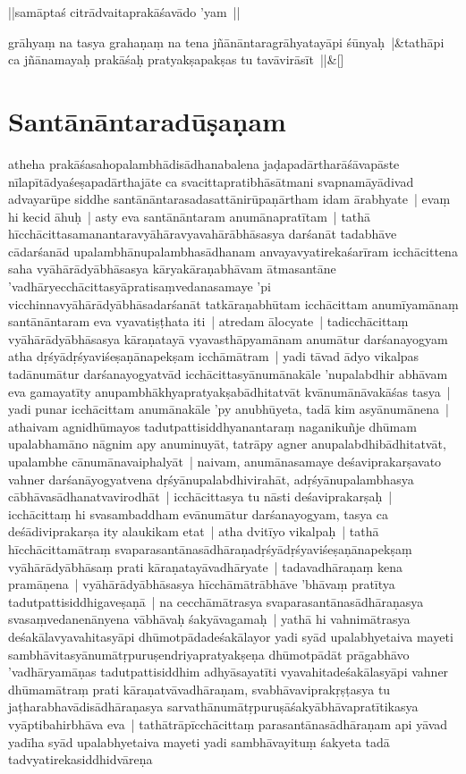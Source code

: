 \documentclass[article,12pt,a4paper]{memoir}
\begin{document}
	  \pstart ||samāptaś citrādvaitaprakāśavādo 'yam ||
	\pend
      
	    
	    \stanza[\smallbreak]
	grāhyaṃ na tasya grahaṇaṃ na tena jñānāntaragrāhyatayāpi śūnyaḥ |&tathāpi ca jñānamayaḥ prakāśaḥ pratyakṣapakṣas tu tavāvirāsīt ||\&[\smallbreak]


	
	  
	
\chapter[{Santānāntaradūṣaṇam}]{Santānāntaradūṣaṇam}\label{Santānāntaradūṣaṇam}

	  \pstart atheha prakāśasahopalambhādisādhanabalena jaḍapadārtharāśāvapāste nīlapītādyaśeṣapadārthajāte ca svacittapratibhāsātmani svapnamāyādivad advayarūpe siddhe santānāntarasadasattānirūpaṇārtham idam ārabhyate | \label{thakur75-145.6} evaṃ hi kecid āhuḥ | asty eva santānāntaram anumānapratītam | tathā hīcchācittasamanantaravyāhāravyavahārābhāsasya darśanāt tadabhāve cādarśanād upalambhānupalambhasādhanam anvayavyatirekaśarīram icchācittena saha vyāhārādyābhāsasya kāryakāraṇabhāvam ātmasantāne 'vadhāryecchācittasyāpratisaṃvedanasamaye 'pi vicchinnavyāhārādyābhāsadarśanāt tatkāraṇabhūtam icchācittam anumīyamānaṃ santānāntaram eva vyavatiṣṭhata iti | \label{thakur75-145.12} atredam ālocyate | tadicchācittaṃ vyāhārādyābhāsasya kāraṇatayā vyavasthāpyamānam anumātur darśanayogyam atha dṛśyādṛśyaviśeṣaṇānapekṣam icchāmātram | yadi tāvad ādyo vikalpas tadānumātur darśanayogyatvād icchācittasyānumānakāle 'nupalabdhir abhāvam eva gamayatīty anupambhākhyapratyakṣabādhitatvāt kvānumānāvakāśas tasya | yadi punar icchācittam anumānakāle 'py anubhūyeta, tadā kim asyānumānena | athaivam agnidhūmayos tadutpattisiddhyanantaraṃ naganikuñje dhūmam upalabhamāno nāgnim apy anuminuyāt, tatrāpy agner anupalabdhibādhitatvāt, upalambhe cānumānavaiphalyāt | naivam, anumānasamaye deśaviprakarṣavato vahner darśanāyogyatvena dṛśyānupalabdhivirahāt, adṛśyānupalambhasya cābhāvasādhanatvavirodhāt | icchācittasya tu nāsti deśaviprakarṣaḥ | icchācittaṃ hi svasambaddham evānumātur darśanayogyam, tasya ca deśādiviprakarṣa ity alaukikam etat | \label{thakur75-145.23} atha dvitīyo vikalpaḥ | tathā hīcchācittamātraṃ svaparasantānasādhāraṇadṛśyādṛśyaviśeṣaṇānapekṣaṃ vyāhārādyābhāsaṃ prati kāraṇatayāvadhāryate | tadavadhāraṇaṃ kena pramāṇena | vyāhārādyābhāsasya hīcchāmātrābhāve 'bhāvaṃ pratītya tadutpattisiddhigaveṣaṇā | na cecchāmātrasya svaparasantānasādhāraṇasya svasaṃvedanenānyena vābhāvaḥ śakyāvagamaḥ | yathā hi vahnimātrasya deśakālavyavahitasyāpi dhūmotpādadeśakālayor yadi syād upalabhyetaiva mayeti sambhāvitasyānumātṛpuruṣendriyapratyakṣeṇa dhūmotpādāt prāgabhāvo 'vadhāryamāṇas tadutpattisiddhim adhyāsayatīti vyavahitadeśakālasyāpi vahner dhūmamātraṃ prati kāraṇatvāvadhāraṇam, svabhāvaviprakṛṣṭasya tu jaṭharabhavādisādhāraṇasya sarvathānumātṛpuruṣāśakyābhāvapratītikasya vyāptibahirbhāva eva | tathātrāpīcchācittaṃ parasantānasādhāraṇam api yāvad yadīha syād upalabhyetaiva mayeti yadi sambhāvayituṃ śakyeta tadā tadvyatirekasiddhidvāreṇa 
\end{document}
